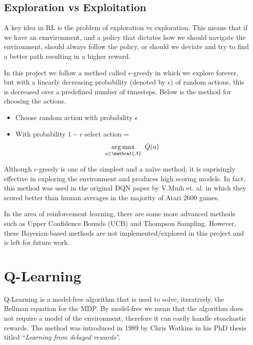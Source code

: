 \subsection{Exploration vs Exploitation}
\label{dsgn:sec:rl:expt-v-explor}
A key idea in RL is the problem of exploration vs exploration. This means that if we have an ennvironment, and a policy that dictates how we should navigate the environment, should always follow the policy, or should we deviate and try to find a better path resulting in a higher reward.

In this project we follow a method called $\epsilon$-greedy in which we explore forever, but with a linearly decreasing probability (denoted by $\epsilon$) of random actions, this is decreased over a predefined number of timesteps. Below is the method for choosing the actions.

\begin{center}
	\begin{itemize}
		\item Choose random action with probability $\epsilon$
		\item With probability $1 - \epsilon$ select \vspace*{-9.25mm} action = $$\argmax_{a \in \mathcal{A}}~\hat{Q}(a)$$
	\end{itemize}
\end{center}

Although $\epsilon$-greedy is one of the simplest and a naïve method, it is suprisingly effective in exploring the environment and produces high scoring models. In fact, this method was used in the original DQN paper by V.Mnih et. al. in which they scored better than human averages in the majority of Atari 2600 games.

In the area of reinforcement learning, there are some more advanced methods such as Upper Confidence Bounds (UCB) and Thompson Sampling. However, these Bayesian-based methods are not implemented/explored in this project and is left for future work.

\section{Q-Learning}
\label{dsgn:sec:qlearning}
Q-Learning is a model-free algorithm that is used to solve, iteratively, the Bellman equation for the MDP. By model-free we mean that the algorithm does not require a model of the environment, therefore it can easily handle stoachastic rewards. The method was introduced in 1989 by Chris Watkins in his PhD thesis titled ``\textit{Learning from delayed rewards}''.


